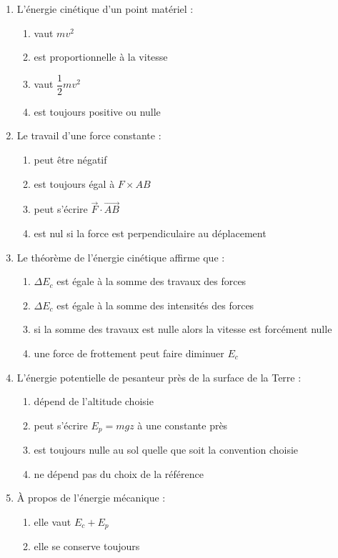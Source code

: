 \documentclass[11pt,a4paper]{article}
\begin{document}
\begin{enumerate}[label=\textbf{QCM \arabic*.},leftmargin=*]
\begin{enumerate}[label=\alph*)]
\end{enumerate}
\item L'énergie cinétique d'un point matériel :
\begin{enumerate}[label=\alph*)]
\item vaut $mv^2$
\item est proportionnelle à la vitesse
\item vaut $\dfrac12 mv^2$
\item est toujours positive ou nulle
\end{enumerate}
\item Le travail d'une force constante :
\begin{enumerate}[label=\alph*)]
\item peut être négatif
\item est toujours égal à $F\times AB$
\item peut s'écrire $\vec F\cdot \vec{AB}$
\item est nul si la force est perpendiculaire au déplacement
\end{enumerate}
\item Le théorème de l'énergie cinétique affirme que :
\begin{enumerate}[label=\alph*)]
\item $\Delta E_c$ est égale à la somme des travaux des forces
\item $\Delta E_c$ est égale à la somme des intensités des forces
\item si la somme des travaux est nulle alors la vitesse est forcément nulle
\item une force de frottement peut faire diminuer $E_c$
\end{enumerate}
\item L'énergie potentielle de pesanteur près de la surface de la Terre :
\begin{enumerate}[label=\alph*)]
\item dépend de l'altitude choisie
\item peut s'écrire $E_p=mgz$ à une constante près
\item est toujours nulle au sol quelle que soit la convention choisie
\item ne dépend pas du choix de la référence
\end{enumerate}
\item À propos de l'énergie mécanique :
\begin{enumerate}[label=\alph*)]
\item elle vaut $E_c+E_p$
\item elle se conserve toujours

\end{enumerate}
\end{enumerate}
\end{document}
